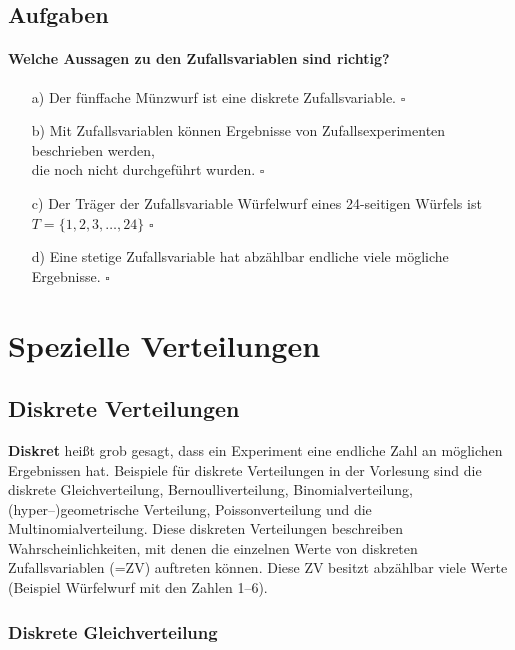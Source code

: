 \documentclass[a4paper]{article}
\begin{document}
\clearpage

\subsection{Aufgaben}
\paragraph{Welche Aussagen zu den Zufallsvariablen sind richtig?}
\begin{itemize}
    \item[a)] Der fünffache Münzwurf ist eine diskrete Zufallsvariable. \hfill $\square$
    \item[b)] Mit Zufallsvariablen können Ergebnisse von Zufallsexperimenten beschrieben werden,\\ die noch nicht durchgeführt wurden. \hfill $\square$
    \item[c)] Der Träger der Zufallsvariable Würfelwurf eines 24-seitigen Würfels ist\\ $T = \{1, 2, 3, \hdots, 24\}$ \hfill $\square$
    \item[d)] Eine stetige Zufallsvariable hat abzählbar endliche viele mögliche Ergebnisse. \hfill $\square$
\end{itemize}

\clearpage


\section{Spezielle Verteilungen} \label{sec:Distr}

\subsection{Diskrete Verteilungen} \label{sec:discretedistr}
\textbf{Diskret} heißt grob gesagt, dass ein Experiment eine endliche Zahl an möglichen Ergebnissen hat. Beispiele für diskrete Verteilungen in der Vorlesung sind die diskrete Gleichverteilung, Bernoulliverteilung, Binomialverteilung, (hyper--)geometrische Verteilung, Poissonverteilung und die Multinomialverteilung. Diese diskreten Verteilungen beschreiben Wahrscheinlichkeiten, mit denen die einzelnen Werte von diskreten Zufallsvariablen (=ZV) auftreten können. Diese ZV besitzt abzählbar viele Werte (Beispiel Würfelwurf mit den Zahlen 1--6).


\subsubsection{Diskrete Gleichverteilung} \label{sec:duni}
\end{document}
